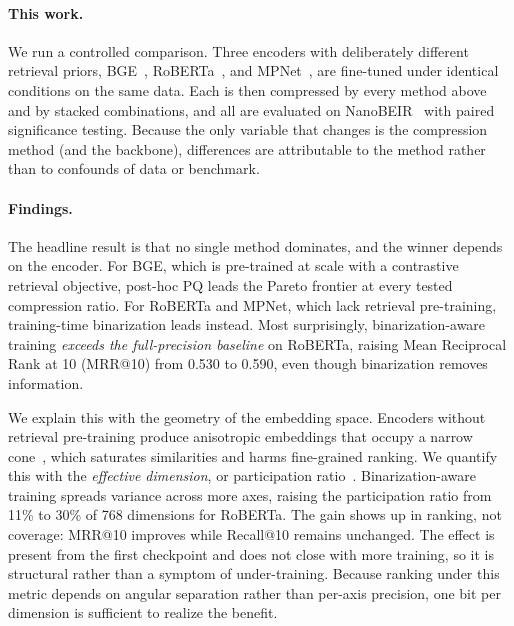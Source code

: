 \paragraph{This work.}
We run a controlled comparison. Three encoders with deliberately different
retrieval priors, BGE~\citep{xiao2023c}, RoBERTa~\citep{liu2019roberta}, and
MPNet~\citep{song2020mpnet}, are fine-tuned under identical conditions on the
same data. Each is then compressed by every method above and by stacked
combinations, and all are evaluated on NanoBEIR~\citep{nanobeir2024} with
paired significance testing. Because the only variable that changes is the
compression method (and the backbone), differences are attributable to the
method rather than to confounds of data or benchmark.

\paragraph{Findings.}
The headline result is that no single method dominates, and the winner depends
on the encoder. For BGE, which is pre-trained at scale with a contrastive
retrieval objective, post-hoc PQ leads the Pareto frontier at every tested
compression ratio. For RoBERTa and MPNet, which lack retrieval pre-training,
training-time binarization leads instead. Most surprisingly, binarization-aware
training \emph{exceeds the full-precision baseline} on RoBERTa, raising Mean Reciprocal Rank at 10 (MRR@10)
from 0.530 to 0.590, even though binarization removes information.

We explain this with the geometry of the embedding space. Encoders without
retrieval pre-training produce anisotropic embeddings that occupy a narrow
cone~\citep{ethayarajh2019contextual}, which saturates similarities and harms
fine-grained ranking. We quantify this with the \emph{effective dimension}, or
participation ratio~\citep{litwinkumar2017optimal, gao2017theory}.
Binarization-aware training spreads variance across more axes, raising the
participation ratio from 11\% to 30\% of 768 dimensions for RoBERTa. The gain
shows up in ranking, not coverage: MRR@10 improves while Recall@10 remains
unchanged.
The effect is present from the first checkpoint and does not close with more
training, so it is structural rather than a symptom of under-training. Because
ranking under this metric depends on angular separation rather than per-axis
precision, one bit per dimension is sufficient to realize the benefit.

